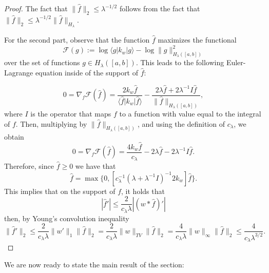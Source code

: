 \begin{proof}
    The fact that $\|\hat f\|_{2} \le \lambda^{-1/2}$ follows from the fact that $\|\hat f\|_{2} \le \lambda^{-1/2}\|\hat f\|_{H_{\lambda}}$.

For the second part, observe that the function $\hat f$ maximizes the functional
	\begin{equation*}
		\mathcal F (g) :=  \log \langle g|k_w|g\rangle   -  \log \|g\|^2_{H_{\lambda}([a,b])}
	\end{equation*}
	over the set of functions  $g\in H_{\lambda}([a,b])$. This leads to the following Euler-Lagrange equation inside of the support of $\hat f$:

	\begin{equation}\label{euler-lagrange2}
		0 = \nabla_f \mathcal F (\hat f) = \frac{2 k_w \hat f}{\langle \hat f|k_w|\hat f\rangle}  - \frac {2\lambda \hat f+2\lambda^{-1}I \hat f} {\|\hat f\|_{H_{\lambda}([a,b])}} ,
	\end{equation}
	where $I$ is the operator that maps $f$ to a function with value equal to the integral of $f$.
	Then, multiplying by $\|\hat f\|_{H_{\lambda}([a,b])}$, and using the definition of $c_{\lambda}$, we obtain
		\begin{equation*}
		0 = \nabla_f \mathcal F (\hat f) = \frac{4 k_w\hat f}{c_{\lambda}}  -  {2\lambda \hat f-2\lambda^{-1}I\hat f}.
	\end{equation*}
		Therefore, since $\hat f\geq0$ we have that
	\begin{equation}\label{euler lagrange eq for lambda problem}
	\hat f=\max\{0,[c^{-1}_{\lambda}(\lambda+\lambda^{-1}I)^{-1}2k_w]\hat f\}.
	\end{equation}
    This implies that on the support of $f$, it holds that 
$$|\hat f ' |\leq  \frac{2}{c_\lambda \lambda} |(w \ast \hat f)'|$$
then, by Young's convolution inequality
$$
    \|\hat f '\|_2\le \frac{2}{c_\lambda \lambda} \|w'\|_{1}\|\hat f\|_2=\frac{2}{c_\lambda \lambda} \|w\|_{TV} \|\hat f\|_2  = \frac{4}{c_\lambda \lambda} \|w\|_{\infty} \|\hat f\|_2 \le \frac{4}{c_\lambda \lambda^{3/2}}.
    $$
\end{proof}


We are now ready to state the main result of the section:

